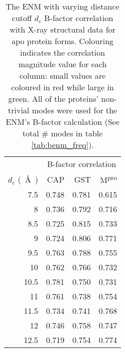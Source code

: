\begin{table}[]
\centering
\caption{The ENM with varying distance cutoff $d_c$ B-factor correlation with X-ray structural data for apo protein forms. Colouring indicates the correlation magnitude value for each column: small values are coloured in red while large in green. All of the proteins' non-trivial modes were used for the ENM's B-factor calculation (See total \# modes in table \ref{tab:benm_freq}).}
\label{tab:bfact_corr}
\begin{tabular}{rccc}
\toprule
\multicolumn{1}{l}{}                                                         & \multicolumn{3}{c}{B-factor correlation} \\ \cline{2-4} 
\multicolumn{1}{r}{$d_c$ (\SI{}{\AA{}})} & \multicolumn{1}{r}{CAP}   & \multicolumn{1}{r}{GST}   & \multicolumn{1}{r}{M\textsuperscript{pro}}   \\ \hline
7.5  & \cellcolor[HTML]{D1EBDA}0.748 & \cellcolor[HTML]{F4F9F8}0.781 & \cellcolor[HTML]{F8696B}0.615 \\
8    & \cellcolor[HTML]{F8FBFB}0.736 & \cellcolor[HTML]{C5E6D0}0.792 & \cellcolor[HTML]{FAD3D6}0.716 \\
8.5  & \cellcolor[HTML]{FBE1E4}0.725 & \cellcolor[HTML]{63BE7B}0.815 & \cellcolor[HTML]{FBE5E8}0.733 \\
9    & \cellcolor[HTML]{FBDFE1}0.724 & \cellcolor[HTML]{8ACE9C}0.806 & \cellcolor[HTML]{BFE3CA}0.771 \\
9.5  & \cellcolor[HTML]{A1D7B0}0.763 & \cellcolor[HTML]{D6EDDE}0.788 & \cellcolor[HTML]{F9FBFC}0.755 \\
10   & \cellcolor[HTML]{A4D9B3}0.762 & \cellcolor[HTML]{FAD5D7}0.766 & \cellcolor[HTML]{FBE4E7}0.732 \\
10.5 & \cellcolor[HTML]{67C07E}0.781 & \cellcolor[HTML]{F9A5A7}0.750 & \cellcolor[HTML]{FBE3E6}0.731 \\
11   & \cellcolor[HTML]{A7DAB6}0.761 & \cellcolor[HTML]{F88083}0.738 & \cellcolor[HTML]{FCFCFF}0.754 \\
11.5 & \cellcolor[HTML]{FBFAFD}0.734 & \cellcolor[HTML]{F88A8C}0.741 & \cellcolor[HTML]{CAE8D4}0.768 \\
12   & \cellcolor[HTML]{D7EDE0}0.746 & \cellcolor[HTML]{FABDBF}0.758 & \cellcolor[HTML]{FBF4F7}0.747 \\
12.5 & \cellcolor[HTML]{FAD1D4}0.719 & \cellcolor[HTML]{F9B1B3}0.754 & \cellcolor[HTML]{B4DFC1}0.774 \\

\end{tabular}
\end{table}
